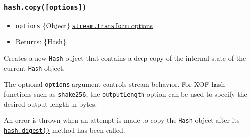 \begin{Shaded}
\begin{Highlighting}[]
\NormalTok{ \{}
\OperatorTok{,}
\NormalTok{\} }\OperatorTok{=} \NormalTok{(}\NormalTok{)}\OperatorTok{;}

\OperatorTok{=} \NormalTok{(}\NormalTok{)}\OperatorTok{;}

\NormalTok{(}\NormalTok{)}\OperatorTok{;}
\NormalTok{(}\NormalTok{))}\OperatorTok{;}
\end{Highlighting}
\end{Shaded}

\subsubsection{\texorpdfstring{\texttt{hash.copy({[}options{]})}}{hash.copy({[}options{]})}}\label{hash.copyoptions}

\begin{itemize}
\tightlist
\item
  \texttt{options} \{Object\}
  \href{stream.md\#new-streamtransformoptions}{\texttt{stream.transform}
  options}
\item
  Returns: \{Hash\}
\end{itemize}

Creates a new \texttt{Hash} object that contains a deep copy of the
internal state of the current \texttt{Hash} object.

The optional \texttt{options} argument controls stream behavior. For XOF
hash functions such as
\texttt{\textquotesingle{}shake256\textquotesingle{}}, the
\texttt{outputLength} option can be used to specify the desired output
length in bytes.

An error is thrown when an attempt is made to copy the \texttt{Hash}
object after its \hyperref[hashdigestencoding]{\texttt{hash.digest()}}
method has been called.

